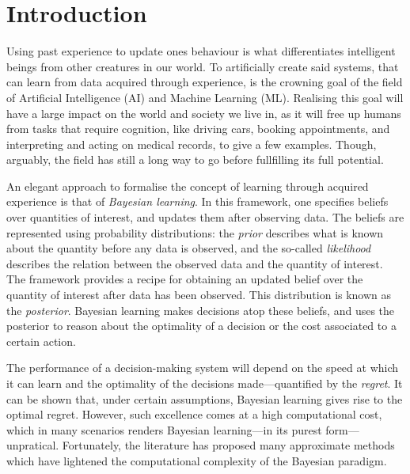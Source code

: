 \chapter{Introduction}  %

Using past experience to update ones behaviour is what differentiates intelligent beings from other creatures in our world. To artificially create said systems, that can learn from data acquired through experience, is the crowning goal of the field of Artificial Intelligence (AI) and Machine Learning (ML).
Realising this goal will have a large impact on the world and society we live in, as it will free up humans from tasks that require cognition, like driving cars, booking appointments, and interpreting and acting on medical records, to give a few examples. Though, arguably, the field has still a long way to go before fullfilling its full potential.

An elegant approach to formalise the concept of learning through acquired experience is that of \emph{Bayesian learning}. In this framework, one specifies beliefs over quantities of interest, and updates them after observing data. The beliefs are represented using probability distributions: the \emph{prior} describes what is known about the quantity before any data is observed, and the so-called \emph{likelihood} describes the relation between the observed data and the quantity of interest. The framework provides a recipe for obtaining an updated belief over the quantity of interest after data has been observed. This distribution is known as the \emph{posterior}. Bayesian learning makes decisions atop these beliefs, and uses the posterior to reason about the optimality of a decision or the cost associated to a certain action.

The performance of a decision-making system will depend on the speed at which it can learn and the optimality of the decisions made---quantified by the \emph{regret}. It can be shown that, under certain assumptions, Bayesian learning gives rise to the optimal regret. However, such excellence comes at a high computational cost, which in many scenarios renders Bayesian learning---in its purest form---unpratical. Fortunately, the literature has proposed many approximate methods which have lightened the computational complexity of the Bayesian paradigm.

